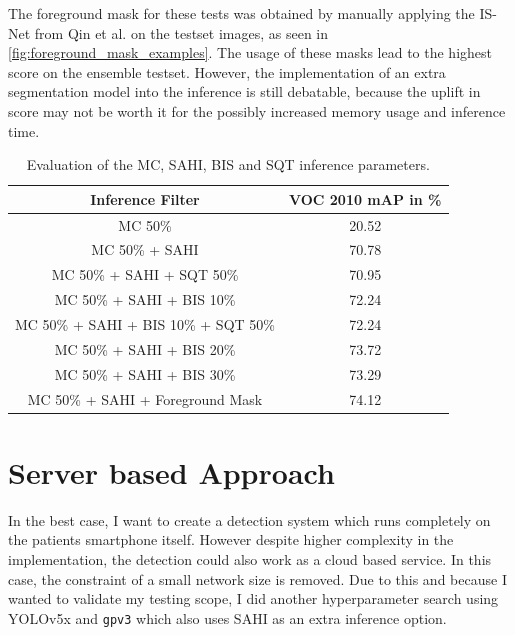 \documentclass[10pt]{book}
\newcommand{\figureref}[1]{\autoref{#1}}
\begin{document}
The foreground mask for these tests was obtained by manually applying the IS-Net from Qin et al. \cite{qin2022} on the testset images, as seen in \figureref{fig:foreground_mask_examples}. The usage of these masks lead to the highest score on the ensemble testset. However, the implementation of an extra segmentation model into the inference is still debatable, because the uplift in score may not be worth it for the possibly increased memory usage and inference time.

\begin{table}
  \begin{tabular}{ c c }
   Inference Filter & VOC 2010 \ac{mAP} in \% \\ 
   \hline
   \ac{MC} 50\% & 20.52 \\
   \ac{MC} 50\% + \ac{SAHI} & 70.78 \\
   \ac{MC} 50\% + \ac{SAHI} + \ac{SQT} 50\% & 70.95 \\
   \ac{MC} 50\% + \ac{SAHI} + \ac{BIS} 10\% & 72.24 \\
   \ac{MC} 50\% + \ac{SAHI} + \ac{BIS} 10\% + \ac{SQT} 50\% & 72.24 \\
   \ac{MC} 50\% + \ac{SAHI} + \ac{BIS} 20\% & 73.72 \\
   \ac{MC} 50\% + \ac{SAHI} + \ac{BIS} 30\% & 73.29 \\
   \ac{MC} 50\% + \ac{SAHI} + Foreground Mask & 74.12 \\
   \hline
  \end{tabular}
  \caption{\label{tab:inference_parameters}Evaluation of the \ac{MC}, \ac{SAHI}, \ac{BIS} and \ac{SQT} inference parameters.}
\end{table} %

\section{Server based Approach}

In the best case, I want to create a detection system which runs completely on the patients smartphone itself. However despite higher complexity in the implementation, the detection could also work as a cloud based service. In this case, the constraint of a small network size is removed. Due to this and because I wanted to validate my testing scope, I did another hyperparameter search using \ac{YOLO}v5x and \texttt{gpv3} which also uses \ac{SAHI} as an extra inference option.
\end{document}
